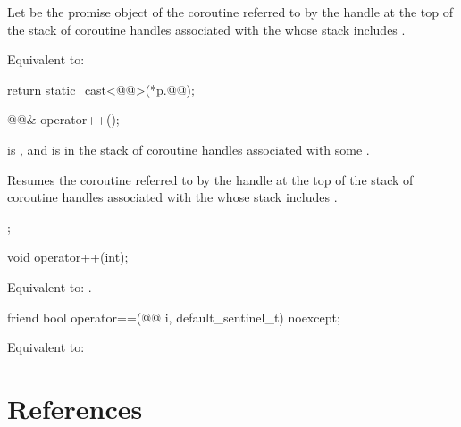 \documentclass{wg21}
\begin{document}
\begin{addedblock}
\begin{itemdescr}
Let  be the promise object of the coroutine
referred to by the handle at the top of
the stack of coroutine handles associated with
the  whose stack includes .

\effects
Equivalent to:
\begin{codeblock}
    return static_cast<@@>(*p.@@);
\end{codeblock}
\end{itemdescr}

\begin{itemdecl}
@@& operator++();
\end{itemdecl}

\begin{itemdescr}
\expects
{} is , and
 is in the stack of coroutine handles associated with
some .

\effects
Resumes the coroutine referred to by the handle
at the top of the stack of coroutine handles associated with
the  whose stack includes .

\returns
{};
\end{itemdescr}

\begin{itemdecl}
void operator++(int);
\end{itemdecl}

\begin{itemdescr}
\effects
Equivalent to: .
\end{itemdescr}

\begin{itemdecl}
friend bool operator==(@@ i, default_sentinel_t) noexcept;
\end{itemdecl}

\begin{itemdescr}
\effects
Equivalent to: 
\end{itemdescr}
\end{addedblock}

\newpage
\section{References}
\renewcommand{\section}[2]{}%


\end{document}
